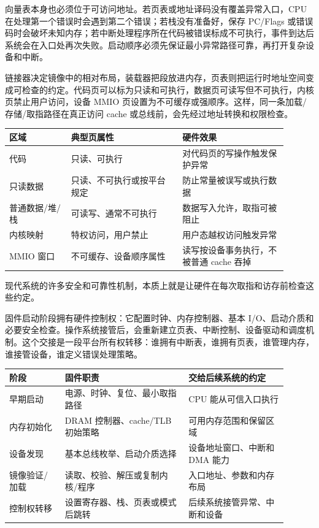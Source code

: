 向量表本身也必须位于可访问地址。若页表或地址译码没有覆盖异常入口，CPU 在处理第一个错误时会遇到第二个错误；若栈没有准备好，保存 PC/Flags 或错误码时会破坏未知内存；若中断处理程序所在代码被错误标成不可执行，事件到达后系统会在入口处再次失败。启动顺序必须先保证最小异常路径可靠，再打开复杂设备和中断。

链接器决定镜像中的相对布局，装载器把段放进内存，页表则把运行时地址空间变成可检查的约定。代码页可以标为只读和可执行，数据页可读写但不可执行，内核页禁止用户访问，设备 MMIO 页设置为不可缓存或强顺序。这样，同一条加载/存储/取指路径在真正访问 cache 或总线前，会先经过地址转换和权限检查。

\begin{longtable}{L{0.2\linewidth}L{0.36\linewidth}L{0.34\linewidth}}
\toprule
区域 & 典型页属性 & 硬件效果 \\
\midrule
代码 & 只读、可执行 & 对代码页的写操作触发保护异常 \\
只读数据 & 只读、不可执行或按平台规定 & 防止常量被误写或执行数据 \\
普通数据/堆/栈 & 可读写、通常不可执行 & 数据写入允许，取指可被阻止 \\
内核映射 & 特权访问，用户禁止 & 用户态越权访问触发异常 \\
MMIO 窗口 & 不可缓存、设备顺序属性 & 读写按设备事务执行，不被普通 cache 吞掉 \\
\bottomrule
\end{longtable}

现代系统的许多安全和可靠性机制，本质上就是让硬件在每次取指和访存前检查这些约定。

固件启动阶段拥有硬件控制权：它配置时钟、内存控制器、基本 I/O、启动介质和必要安全检查。操作系统接管后，会重新建立页表、中断控制、设备驱动和调度机制。这个交接是一段平台所有权转移：谁拥有中断表，谁拥有页表，谁管理内存，谁接管设备，谁定义错误处理策略。

\begin{longtable}{L{0.18\linewidth}L{0.4\linewidth}L{0.32\linewidth}}
\toprule
阶段 & 固件职责 & 交给后续系统的约定 \\
\midrule
早期启动 & 电源、时钟、复位、最小取指路径 & CPU 能从可信入口执行 \\
内存初始化 & DRAM 控制器、cache/TLB 初始策略 & 可用内存范围和保留区域 \\
设备发现 & 基本总线枚举、启动介质选择 & 设备地址窗口、中断和 DMA 能力 \\
镜像验证/加载 & 读取、校验、解压或复制内核/程序 & 入口地址、参数和内存布局 \\
控制权转移 & 设置寄存器、栈、页表或模式后跳转 & 后续系统接管异常、中断和设备 \\
\bottomrule
\end{longtable}

